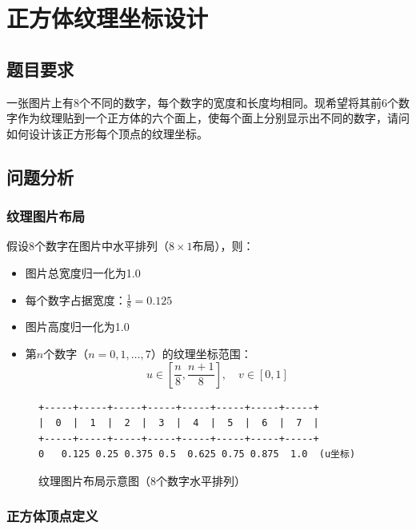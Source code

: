 \documentclass[12pt,a4paper]{article}
\begin{document}
\newpage
\section{正方体纹理坐标设计}

\subsection{题目要求}

一张图片上有8个不同的数字，每个数字的宽度和长度均相同。现希望将其前6个数字作为纹理贴到一个正方体的六个面上，使每个面上分别显示出不同的数字，请问如何设计该正方形每个顶点的纹理坐标。

\subsection{问题分析}

\subsubsection{纹理图片布局}

假设8个数字在图片中水平排列（$8 \times 1$布局），则：
\begin{itemize}
    \item 图片总宽度归一化为1.0
    \item 每个数字占据宽度：$\frac{1}{8} = 0.125$
    \item 图片高度归一化为1.0
    \item 第$n$个数字（$n=0,1,\ldots,7$）的纹理坐标范围：
    \begin{equation}
    u \in \left[\frac{n}{8}, \frac{n+1}{8}\right], \quad v \in [0, 1]
    \end{equation}
\end{itemize}

\begin{figure}[H]
\centering
\begin{verbatim}
+-----+-----+-----+-----+-----+-----+-----+-----+
|  0  |  1  |  2  |  3  |  4  |  5  |  6  |  7  |
+-----+-----+-----+-----+-----+-----+-----+-----+
0   0.125 0.25 0.375 0.5  0.625 0.75 0.875  1.0  (u坐标)
\end{verbatim}
\caption{纹理图片布局示意图（8个数字水平排列）}
\end{figure}

\subsubsection{正方体顶点定义}
\end{document}
